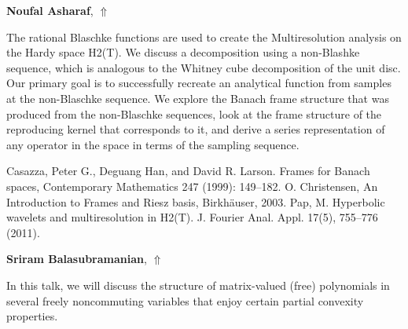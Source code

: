 \documentclass[ILAS2025-program.tex]{subfiles}
\begin{document}
\hypertarget{down0403}{}\begin{ilasabstract}
    
\textbf{Noufal Asharaf},  \hfill \hyperlink{up0403}{$\Uparrow$}
    
    
\mtskip
    \begin{bibunit}
        The rational Blaschke functions are used to create the Multiresolution analysis on the Hardy
space H2(T). We discuss a decomposition using a non-Blashke sequence, which is analogous to
the Whitney cube decomposition of the unit disc. Our primary goal is to successfully recreate an
analytical function from samples at the non-Blaschke sequence. We explore the Banach frame
structure that was produced from the non-Blaschke sequences, look at the frame structure of the
reproducing kernel that corresponds to it, and derive a series representation of any operator in
the space in terms of the sampling sequence.

\begin{thebibliography}{5}
 Casazza, Peter G., Deguang Han, and David R. Larson. Frames for Banach spaces, Contemporary Mathematics 247 (1999): 149--182.
 O. Christensen, An Introduction to Frames and Riesz basis, Birkh\"{a}user, 2003.
 Pap, M. Hyperbolic wavelets and multiresolution in H2(T). J. Fourier Anal. Appl. 17(5), 755--776 (2011).
\end{thebibliography}

        \end{bibunit}
        
\end{ilasabstract}
    

\hypertarget{down0409}{}\begin{ilasabstract}
    
\textbf{Sriram Balasubramanian},  \hfill \hyperlink{up0409}{$\Uparrow$}
    
    
\mtskip
    In this talk, we will discuss the structure of matrix-valued (free) polynomials in several freely noncommuting variables that enjoy certain partial  convexity properties. 
\end{ilasabstract}
    
\end{document}
